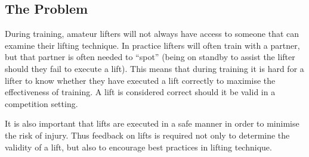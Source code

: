 \subsection{The Problem}

During training, amateur lifters will not always have access to someone that can examine their lifting technique. In practice lifters will often train with a partner, but that partner is often needed to ``spot'' (being on standby to assist the lifter should they fail to execute a lift). This means that during training it is hard for a lifter to know whether they have executed a lift correctly to maximise the effectiveness of training. A lift is considered correct should it be valid in a competition setting.

It is also important that lifts are executed in a safe manner in order to minimise the risk of injury. Thus feedback on lifts is required not only to determine the validity of a lift, but also to encourage best practices in lifting technique.